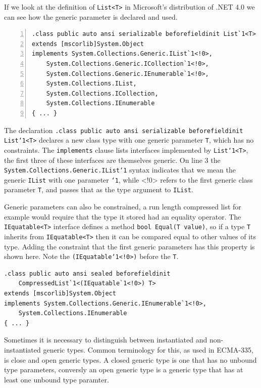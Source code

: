 \documentclass[english]{report}
\begin{document}
If we look at the definition of \texttt{List<T>} in Microsoft\textquoteright{}s
distribution of .NET 4.0 we can see how the generic parameter is declared
and used.
\begin{lstlisting}[numbers=left,language=cil]
.class public auto ansi serializable beforefieldinit List`1<T>
extends [mscorlib]System.Object 
implements System.Collections.Generic.IList`1<!0>, 
	System.Collections.Generic.ICollection`1<!0>, 
	System.Collections.Generic.IEnumerable`1<!0>, 
	System.Collections.IList, 
	System.Collections.ICollection, 
	System.Collections.IEnumerable
{ ... }
\end{lstlisting}


The declaration \texttt{.class public auto ansi serializable beforefieldinit
List`1<T>} declares a new class type with one generic parameter \texttt{T},
which has no constraints. The \texttt{implements} clause lists interfaces
implemented by \texttt{List`1<T>}, the first three of these interfaces
are themselves generic. On line 3 the \texttt{System.Collections.Generic.IList`1}
syntax indicates that we mean the generic \texttt{IList} with one
parameter \texttt{`1}, while <!0> refers to the first generic class
parameter \texttt{T}, and passes that as the type argument to \texttt{IList}.

Generic parameters can also be constrained, a run length compressed
list for example would require that the type it stored had an equality
operator. The \texttt{IEquatable<T>} interface defines a method \texttt{bool
Equal(T value)}, so if a type \texttt{T} inherits from \texttt{IEquatable<T>}
then it can be compared equal to other values of its type. Adding
the constraint that the first generic parameters has this property
is shown here. Note the \texttt{(IEquatable`1<!0>)} before the \texttt{T}.

\begin{lstlisting}[language=cil]
.class public auto ansi sealed beforefieldinit
	CompressedList`1<(IEquatable`1<!0>) T> 
extends [mscorlib]System.Object
implements System.Collections.Generic.IEnumerable`1<!0>, 
	System.Collections.IEnumerable
{ ... }
\end{lstlisting}


Sometimes it is necessary to distinguish between instantiated and
non-instantiated generic types. Common terminology for this, as used
in ECMA-335, is close and open generic types. A closed generic type
is one that has no unbound type parameters, conversly an open generic
type is a generic type that has at least one unbound type paramter.
\end{document}
